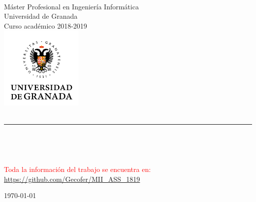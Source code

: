 \documentclass{manual}
\begin{document}




\begin{titlepage}
  \centering
  {\textbf{\nombrecurso \vspace*{.1cm}\\} Máster Profesional en Ingeniería Informática \vspace*{.05cm} \\ Universidad de Granada \vspace*{.05cm} \\ Curso académico 2018-2019} \\
  \vspace*{1.5cm}
  \includegraphics[height=4cm]{images/download-2.png}\\
  \vspace*{2.5cm}
  {\fontsize{28}{34}\selectfont\bfseries \thetitle} \\
  \vspace*{0.9cm}
  {\color{gris1}\hrule}
  \Large{\itshape \subtitulo}\\
  \vspace*{3.5cm}
  \begin{center}
    {\large \authorG} \\
  \end{center}
  \vspace{3.5cm}
  
  \textcolor{red}{Toda la información del trabajo se encuentra en: \url{https://github.com/Gecofer/MII_ASS_1819}}
  
  \vspace{0.3cm}
  \begin{center}
      {\large \today}
  \end{center}
\end{titlepage}

\end{document}
